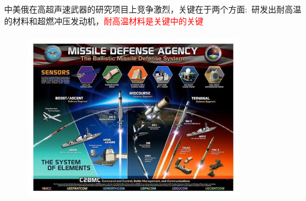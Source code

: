 {\begin{itemize}
中美俄在高超声速武器的研究项目上竞争激烈，关键在于两个方面:~研发出耐高温的材料和超燃冲压发动机，\textcolor{red}{耐高温材料是关键中的关键}
\begin{figure}[h!]
\vspace*{-0.20in}
\centering
\includegraphics[height=2.90in,width=3.70in]{Figures/Main-qimg.jpeg}
\label{BMDS}
\end{figure}
	\end{itemize}
}
